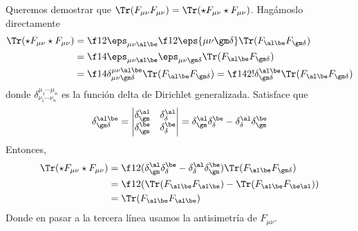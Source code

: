 Queremos demostrar que $\Tr(F_{\mu\nu}F_{\mu\nu})=\Tr(\star F_{\mu\nu}\star F_{\mu\nu})$. Hagámoslo directamente
\begin{align*}
	\Tr(\star F_{\mu\nu}\star F_{\mu\nu}) &= \f 12\eps_{\mu\nu\al\be}\f 12\eps{\mu\nu\gm\delta}\Tr(F_{\al\be}F_{\gm\delta})\\
	&= \f 14\eps_{\mu\nu\al\be}\eps_{\mu\nu\gm\delta}\Tr(F_{\al\be}F_{\gm\delta})\\
	&= \f 14\delta^{\mu\nu\al\be}_{\mu\nu\gm\delta}\Tr(F_{\al\be}F_{\gm\delta}) = \f 142!\delta^{\al\be}_{\gm\delta}\Tr(F_{\al\be}F_{\gm\delta})
\end{align*}
donde $\delta^{\mu_1\cdots\mu_n}_{\nu_1\cdots\nu_n}$ es la función delta de Dirichlet generalizada. Satisface que
\begin{align*}
	\delta^{\al\be}_{\gm\delta} = \left| \begin{matrix}
	\delta^{\al}_\gm & \delta^{\al}_\delta\\
	\delta^{\be}_\gm & \delta^\be_\delta
	\end{matrix}	\right| = \delta^\al_\gm\delta^\be_\delta-\delta^\al_\delta\delta^\be_\gm
\end{align*}
Entonces,
\begin{align*}
	\Tr(\star F_{\mu\nu}\star F_{\mu\nu}) &= \f 12(\delta^\al_\gm\delta^\be_\delta-\delta^\al_\delta\delta^\be_\gm)\Tr(F_{\al\be}F_{\gm\delta})\\
	&= \f 12(\Tr(F_{\al\be}F_{\al\be})-\Tr(F_{\al\be}F_{\be\al}))\\
	&= \Tr(F_{\al\be}F_{\al\be})
\end{align*}
Donde en pasar a la tercera línea usamos la antisimetría de $F_{\mu\nu}$.